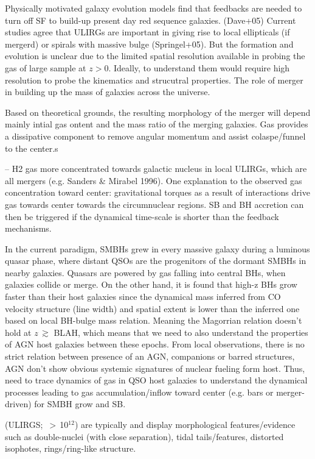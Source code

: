 Physically motivated galaxy evolution models find that feedbacks are needed to turn off SF to build-up present day red sequence galaxies. (Dave+05)
Current studies agree that ULIRGs are important in giving rise to local
ellipticals (if mergerd) or spirals with massive bulge (Springel+05). But the formation and evolution is unclear due to the limited spatial resolution available in probing the gas of large sample at $z$$>$0. Ideally, to understand them would require high resolution to probe the kinematics and strucutral properties.
The role of merger in building up the mass of galaxies across the universe.

Based on theoretical grounds, the resulting morphology of the merger will depend mainly intial gas ontent and the mass ratio of the merging galaxies. Gas provides a dissipative component to remove angular momentum and assist colaspe/funnel to the center.s

 -- H2 gas more concentrated towards galactic nucleus in local ULIRGs, which are all mergers (e.g. Sanders & Mirabel 1996).
One explanation to the observed gas concentration toward center: gravitational torques as a result of interactions drive gas towards center towards the circumnuclear regions. SB and BH accretion can then be triggered if the dynamical time-scale is shorter than the feedback mechanisms.


In the current paradigm, SMBHs grew in every massive galaxy during a luminous quasar phase, where distant QSOs are the
progenitors of the dormant SMBHs in nearby galaxies. Quasars are powered by gas falling into central BHs, when galaxies
collide or merge.
On the other hand, it is found that high-z BHs grow faster than their host galaxies since the dynamical mass inferred from CO velocity structure (line width) and spatial extent is lower than the inferred one based on local BH-bulge mass relation.
Meaning the Magorrian relation doesn't hold at $z$\,$\gtrsim$ BLAH, which means that we need to also understand the
properties of AGN host galaxies between these epochs.
From local observations, there is no strict relation between presence of an AGN, companions or barred structures, AGN don't
show obvious systemic signatures of nuclear fueling form host. Thus, need to trace dynamics of gas in QSO host galaxies to understand the dynamical processes leading to
gas accumulation/inflow toward center (e.g. bars or merger-driven) for SMBH grow and SB.


(ULIRGS; \LIR\,$>$\,10$^{12}$\Lsun) are typically and display morphological features/evidence such as double-nuclei (with close separation), tidal tails/features, distorted isophotes, rings/ring-like structure.


